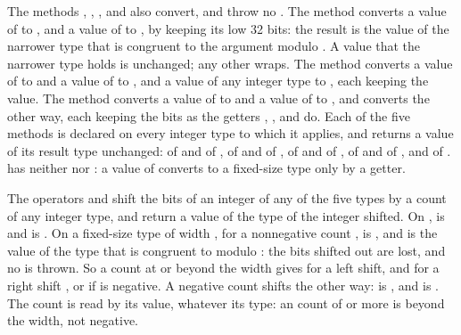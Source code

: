The methods , , ,  and
 also convert, and throw no .
The method  converts a value of  to
, and a value of  to , by
keeping its low 32 bits: the result is the value of the narrower type that is
congruent to the argument modulo .
A value that the narrower type holds is unchanged; any other wraps.
The method  converts a value of  to
 and a value of  to , and
 a value of any integer type to , each keeping the value.
The method  converts a value of  to
 and a value of  to , and
 converts the other way, each keeping the bits as the getters
, ,  and  do.
Each of the five methods is declared on every integer type to which it applies,
and returns a value of its result type unchanged:  of
 and of ,  of 
and of ,  of  and of
,  of  and of
, and  of .
 has neither  nor : a value of
 converts to a fixed-size type only by a getter.

The operators  and  shift the bits of an integer of any of
the five types by a count of any integer type, and return a value of the type of
the integer shifted.
On ,  is  and
 is .
On a fixed-size type of width , for a nonnegative count ,
 is , and
 is the value of the type that is congruent to
 modulo : the bits shifted out are lost, and no
 is thrown.
So a count at or beyond the width gives  for a left shift, and for a right
shift , or  if  is negative.
A negative count shifts the other way:  is
, and  is .
The count is read by its value, whatever its type: an  count of
 or more is beyond the width, not negative.

